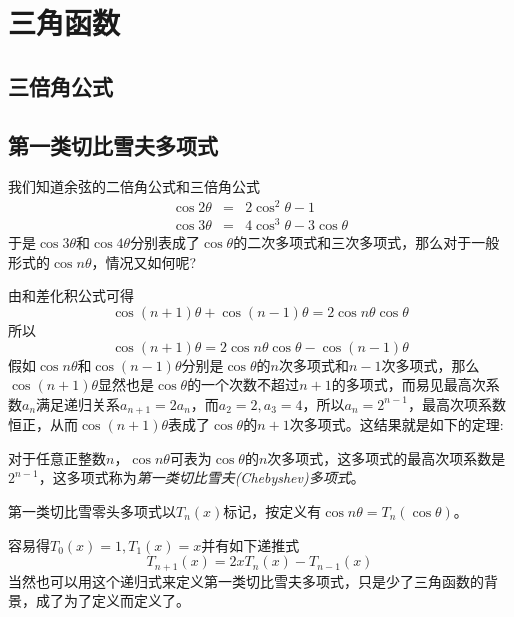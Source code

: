 
\section{三角函数}
\label{sec:triangle-function}

\subsection{三倍角公式}
\label{sec:triple-angle-formula}

\subsection{第一类切比雪夫多项式}
\label{sec:first-chebyshev-polynome}

我们知道余弦的二倍角公式和三倍角公式
\begin{eqnarray*}
  \cos{2\theta} & = & 2\cos^2{\theta}-1 \\
  \cos{3\theta} & = & 4\cos^3{\theta}-3\cos{\theta}
\end{eqnarray*}
于是$\cos{3\theta}$和$\cos{4\theta}$分别表成了$\cos{\theta}$的二次多项式和三次多项式，那么对于一般形式的$\cos{n\theta}$，情况又如何呢?

由和差化积公式可得
\[ \cos{(n+1)\theta}+\cos{(n-1)\theta}=2\cos{n\theta}\cos{\theta} \]
所以
\[ \cos{(n+1)\theta}=2\cos{n\theta}\cos{\theta}-\cos{(n-1)\theta} \]
假如$\cos{n\theta}$和$\cos{(n-1)\theta}$分别是$\cos{\theta}$的$n$次多项式和$n-1$次多项式，那么$\cos{(n+1)\theta}$显然也是$\cos{\theta}$的一个次数不超过$n+1$的多项式，而易见最高次系数$a_n$满足递归关系$a_{n+1}=2a_n$，而$a_2=2,a_3=4$，所以$a_n=2^{n-1}$，最高次项系数恒正，从而$\cos{(n+1)\theta}$表成了$\cos{\theta}$的$n+1$次多项式。这结果就是如下的定理:

\begin{theorem}[切比雪夫多项式定理]
  对于任意正整数$n$，$\cos{n\theta}$可表为$\cos{\theta}$的$n$次多项式，这多项式的最高次项系数是$2^{n-1}$，这多项式称为\emph{第一类切比雪夫(Chebyshev)多项式}。
\end{theorem}

第一类切比雪零头多项式以$T_n(x)$标记，按定义有$\cos{n\theta}=T_n(\cos{\theta})$。

容易得$T_0(x)=1,T_1(x)=x$并有如下递推式
\begin{equation}
  \label{eq:first-chebyshev-polynome-recursion}
  T_{n+1}(x)=2xT_n(x)-T_{n-1}(x)
\end{equation}
当然也可以用这个递归式来定义第一类切比雪夫多项式，只是少了三角函数的背景，成了为了定义而定义了。

